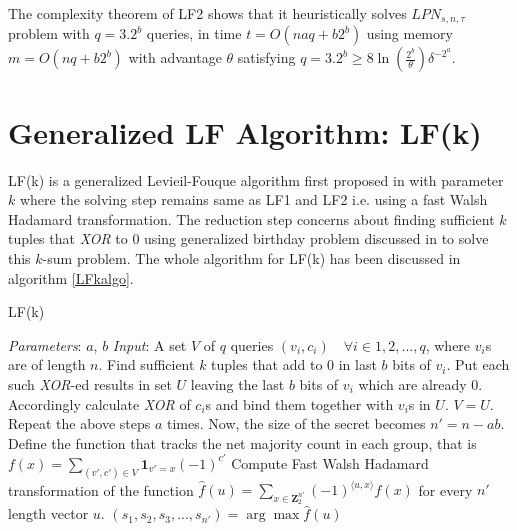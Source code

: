 \documentclass{article}
\begin{document}
    The complexity theorem of LF2 shows that it heuristically solves $LPN_{s,n,\tau}$ problem with $q=3.2^b$ queries, in time $t=O(naq+b2^b)$ using memory $m=O(nq+b2^b)$ with advantage $\theta$ satisfying $q=3.2^b\ge 8\ln(\frac{2^b}{\theta})\delta^{-2^a}$.

   \section{Generalized LF Algorithm: LF(k)}
   LF(k) is a generalized Levieil-Fouque algorithm first proposed in \cite{LFk} with parameter $k$ where the solving step remains same as LF1 and LF2 i.e. using a fast Walsh Hadamard transformation. The reduction step concerns about finding sufficient $k$ tuples that \emph{XOR} to $0$ using generalized birthday problem discussed in \cite{Ksum} to solve this $k$-sum problem. The whole algorithm for LF(k) has been discussed in algorithm \ref{LFkalgo}.
   
   \begin{algorithm}
   	\caption{LF(k)} \label{LFkalgo}
   	\begin{algorithmic}[1]
   		\State \emph{Parameters}: $a$, $b$
   		\State \emph{Input}:
   		A set $V$ of $q$ queries $(v_i,c_i)\quad\forall i\in {1,2,...,q}$, where $v_i$s are of length $n$.
   		\State Find sufficient $k$ tuples that add to $0$ in last $b$ bits of $v_i$. Put each such \emph{XOR}-ed results in set $U$ leaving the last $b$ bits of $v_i$ which are already $0$. 
   		\State Accordingly calculate \emph{XOR} of $c_i$s and bind them together with $v_i$s in $U$.
   		\State $V=U$.
   		\State Repeat the above steps $a$ times.
   		\State Now, the size of the secret becomes $n'=n-ab$. 
   		\State Define the function that tracks the net majority count in each group, that is $f(x)=\sum_{(v',c')\in V}\mathbf{1}_{v'=x}(-1)^{c'}$
   		\State Compute Fast Walsh Hadamard transformation of the function $\hat{f}(u)=\sum_{x\in\mathbf{Z}_2^{n'}}(-1)^{\langle u,x\rangle}f(x)$ for every $n'$ length vector $u$.
   		\State $(s_1,s_2,s_3,...,s_{n'})=\arg\max{\hat{f}(u)}$
   	\end{algorithmic}
   \end{algorithm}

  \newtheorem{lemma}{Lemma}
  \newtheorem{theorem}{Theorem}
  
\end{document}

